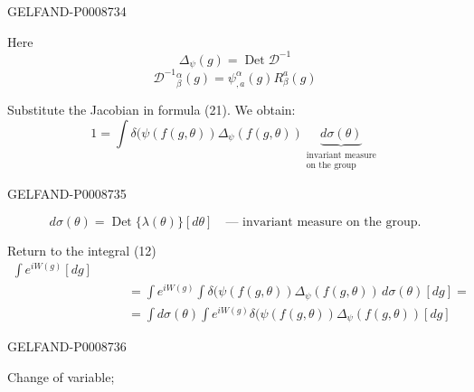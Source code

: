 \begin{GelfandAdjacentEvidence}{GELFAND-P000873}{4}


Here
\begin{equation*}
\Delta_\psi(g)=\operatorname{Det}\mathcal D^{-1}
\tag{24}
\end{equation*}
\begin{equation*}
\mathcal D^{-1}{}^\alpha_\beta(g)=\psi^\alpha_{,a}(g)R_\beta^a(g)
\tag{25}
\end{equation*}

Substitute the Jacobian in formula (21). We obtain:
\begin{equation*}
1=\int\delta(\psi(f(g,\theta))\Delta_\psi(f(g,\theta))
\underbrace{d\sigma(\theta)}_{\substack{\text{invariant measure}\\\text{on the group}}}
\tag{26}
\end{equation*}
\end{GelfandAdjacentEvidence}
\begin{GelfandAdjacentEvidence}{GELFAND-P000873}{5}


\begin{equation*}
d\sigma(\theta)=\operatorname{Det}\{\lambda(\theta)\}[d\theta]
\quad\text{--- invariant measure on the group.}
\tag{27}
\end{equation*}

Return to the integral (12)
\begin{equation*}
\begin{aligned}
\int e^{iW(g)}[dg]\qquad &\\[-.2ex]
&=\int e^{iW(g)}\int\delta(\psi(f(g,\theta))
\Delta_\psi(f(g,\theta))\,d\sigma(\theta)[dg]=\\
&=\int d\sigma(\theta)\int e^{iW(g)}\delta(\psi(f(g,\theta))
\Delta_\psi(f(g,\theta))[dg]
\end{aligned}
\tag{28}
\end{equation*}
\end{GelfandAdjacentEvidence}
\begin{GelfandAdjacentEvidence}{GELFAND-P000873}{6}

\end{GelfandAdjacentEvidence}


Change of variable;


